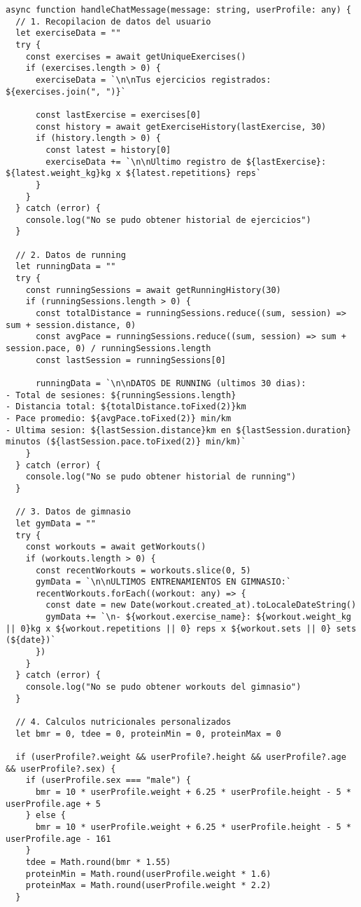 \documentclass[12pt,a4paper]{article}
\begin{document}
\begin{lstlisting}[caption=Funcion handleChatMessage - Chat personalizado]
async function handleChatMessage(message: string, userProfile: any) {
  // 1. Recopilacion de datos del usuario
  let exerciseData = ""
  try {
    const exercises = await getUniqueExercises()
    if (exercises.length > 0) {
      exerciseData = `\n\nTus ejercicios registrados: ${exercises.join(", ")}`
      
      const lastExercise = exercises[0]
      const history = await getExerciseHistory(lastExercise, 30)
      if (history.length > 0) {
        const latest = history[0]
        exerciseData += `\n\nUltimo registro de ${lastExercise}: ${latest.weight_kg}kg x ${latest.repetitions} reps`
      }
    }
  } catch (error) {
    console.log("No se pudo obtener historial de ejercicios")
  }

  // 2. Datos de running
  let runningData = ""
  try {
    const runningSessions = await getRunningHistory(30)
    if (runningSessions.length > 0) {
      const totalDistance = runningSessions.reduce((sum, session) => sum + session.distance, 0)
      const avgPace = runningSessions.reduce((sum, session) => sum + session.pace, 0) / runningSessions.length
      const lastSession = runningSessions[0]

      runningData = `\n\nDATOS DE RUNNING (ultimos 30 dias):
- Total de sesiones: ${runningSessions.length}
- Distancia total: ${totalDistance.toFixed(2)}km
- Pace promedio: ${avgPace.toFixed(2)} min/km
- Ultima sesion: ${lastSession.distance}km en ${lastSession.duration} minutos (${lastSession.pace.toFixed(2)} min/km)`
    }
  } catch (error) {
    console.log("No se pudo obtener historial de running")
  }

  // 3. Datos de gimnasio
  let gymData = ""
  try {
    const workouts = await getWorkouts()
    if (workouts.length > 0) {
      const recentWorkouts = workouts.slice(0, 5)
      gymData = `\n\nULTIMOS ENTRENAMIENTOS EN GIMNASIO:`
      recentWorkouts.forEach((workout: any) => {
        const date = new Date(workout.created_at).toLocaleDateString()
        gymData += `\n- ${workout.exercise_name}: ${workout.weight_kg || 0}kg x ${workout.repetitions || 0} reps x ${workout.sets || 0} sets (${date})`
      })
    }
  } catch (error) {
    console.log("No se pudo obtener workouts del gimnasio")
  }

  // 4. Calculos nutricionales personalizados
  let bmr = 0, tdee = 0, proteinMin = 0, proteinMax = 0

  if (userProfile?.weight && userProfile?.height && userProfile?.age && userProfile?.sex) {
    if (userProfile.sex === "male") {
      bmr = 10 * userProfile.weight + 6.25 * userProfile.height - 5 * userProfile.age + 5
    } else {
      bmr = 10 * userProfile.weight + 6.25 * userProfile.height - 5 * userProfile.age - 161
    }
    tdee = Math.round(bmr * 1.55)
    proteinMin = Math.round(userProfile.weight * 1.6)
    proteinMax = Math.round(userProfile.weight * 2.2)
  }


\end{lstlisting}
\end{document}
